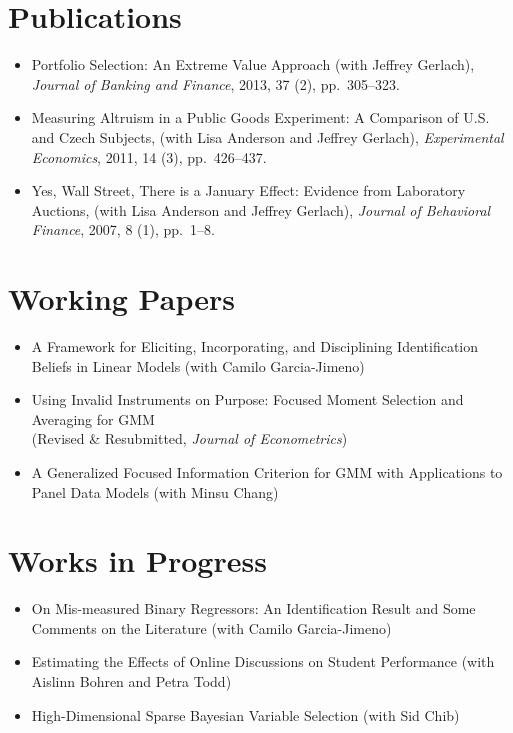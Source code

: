\documentclass[line,overlapped]{myres}
\begin{document}
\begin{resume}

\section{\sc Publications}
\begin{itemize}
	\item Portfolio Selection: An Extreme Value Approach (with Jeffrey Gerlach), \emph{Journal of Banking and Finance}, 2013, 37 (2), pp.\ 305--323.
	\item Measuring Altruism in a Public Goods Experiment:  A Comparison of U.S. and Czech Subjects, (with Lisa Anderson and Jeffrey Gerlach), \emph{Experimental Economics}, 2011, 14 (3), pp.\ 426--437.
	\item Yes, Wall Street, There is a January Effect: Evidence from Laboratory Auctions, (with Lisa Anderson and Jeffrey Gerlach), \emph{Journal of Behavioral Finance}, 2007, 8 (1), pp.\ 1--8. 
\end{itemize}


\section{\sc Working Papers}
\begin{itemize}
	\item A Framework for Eliciting, Incorporating, and Disciplining Identification Beliefs in Linear Models (with Camilo Garcia-Jimeno)
  \item Using Invalid Instruments on Purpose: Focused Moment Selection and Averaging for GMM\\ (Revised \& Resubmitted, \emph{Journal of Econometrics})
	\item A Generalized Focused Information Criterion for GMM with Applications to Panel Data Models (with Minsu Chang)
\end{itemize}




\section{\sc Works in Progress}
\begin{itemize}
  \item On Mis-measured Binary Regressors: An Identification Result and Some Comments on the Literature (with Camilo Garcia-Jimeno)
  \item Estimating the Effects of Online Discussions on Student Performance (with Aislinn Bohren and Petra Todd)
  \item High-Dimensional Sparse Bayesian Variable Selection (with Sid Chib)
\end{itemize}





\end{resume}
\end{document}
